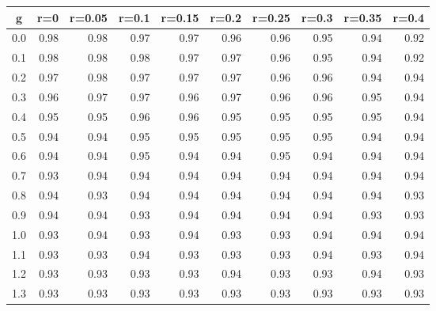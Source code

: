 %
\begin{table}[!tbp]
 \begin{center}
 \begin{tabular}{rrrrrrrrrr}\hline\hline
\multicolumn{1}{c}{g}&\multicolumn{1}{c}{r=0}&\multicolumn{1}{c}{r=0.05}&\multicolumn{1}{c}{r=0.1}&\multicolumn{1}{c}{r=0.15}&\multicolumn{1}{c}{r=0.2}&\multicolumn{1}{c}{r=0.25}&\multicolumn{1}{c}{r=0.3}&\multicolumn{1}{c}{r=0.35}&\multicolumn{1}{c}{r=0.4}\tabularnewline
\hline
0.0&0.98&0.98&0.97&0.97&0.96&0.96&0.95&0.94&0.92\tabularnewline
0.1&0.98&0.98&0.98&0.97&0.97&0.96&0.95&0.94&0.92\tabularnewline
0.2&0.97&0.98&0.97&0.97&0.97&0.96&0.96&0.94&0.94\tabularnewline
0.3&0.96&0.97&0.97&0.96&0.97&0.96&0.96&0.95&0.94\tabularnewline
0.4&0.95&0.95&0.96&0.96&0.95&0.95&0.95&0.95&0.94\tabularnewline
0.5&0.94&0.94&0.95&0.95&0.95&0.95&0.95&0.94&0.94\tabularnewline
0.6&0.94&0.94&0.95&0.94&0.94&0.95&0.94&0.94&0.94\tabularnewline
0.7&0.93&0.94&0.94&0.94&0.94&0.94&0.94&0.94&0.94\tabularnewline
0.8&0.94&0.93&0.94&0.94&0.94&0.94&0.94&0.94&0.93\tabularnewline
0.9&0.94&0.94&0.93&0.94&0.94&0.94&0.94&0.93&0.93\tabularnewline
1.0&0.93&0.94&0.93&0.94&0.93&0.93&0.94&0.94&0.94\tabularnewline
1.1&0.93&0.93&0.94&0.93&0.93&0.93&0.94&0.93&0.94\tabularnewline
1.2&0.93&0.93&0.93&0.93&0.94&0.93&0.93&0.94&0.93\tabularnewline
1.3&0.93&0.93&0.93&0.93&0.93&0.93&0.93&0.93&0.93\tabularnewline
\hline
\end{tabular}

\end{center}

\end{table}

